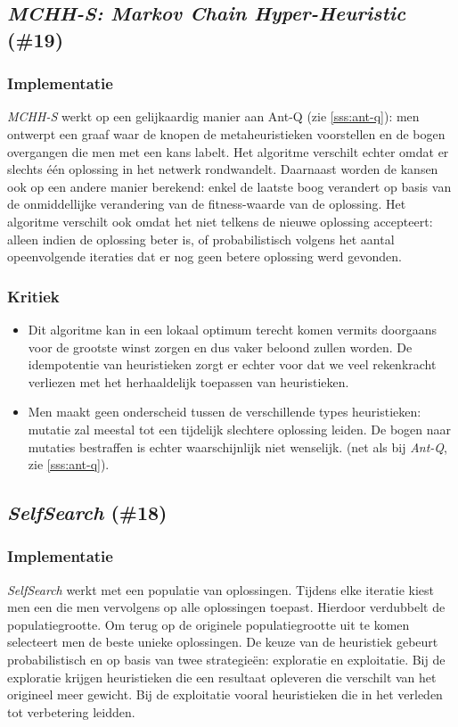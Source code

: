 \subsection{\emph{MCHH-S: Markov Chain Hyper-Heuristic} (\#19)}
\label{sss:mchh-s}
\subsubsection{Implementatie}
\emph{MCHH-S}\cite{chesc-mchh-s,conf/gecco/McClymontK11} werkt op een gelijkaardig manier aan Ant-Q (zie \ref{sss:ant-q}): men ontwerpt een graaf waar de knopen de metaheuristieken voorstellen en de bogen overgangen die men met een kans labelt. Het algoritme verschilt echter omdat er slechts \'e\'en oplossing in het netwerk rondwandelt. Daarnaast worden de kansen ook op een andere manier berekend: enkel de laatste boog verandert op basis van de onmiddellijke verandering van de fitness-waarde van de oplossing. Het algoritme verschilt ook omdat het niet telkens de nieuwe oplossing accepteert: alleen indien de oplossing beter is, of probabilistisch volgens het aantal opeenvolgende iteraties dat er nog geen betere oplossing werd gevonden.
\subsubsection{Kritiek}
\begin{itemize}
 \item Dit algoritme kan in een lokaal optimum terecht komen vermits \abls{} doorgaans voor de grootste winst zorgen en dus vaker beloond zullen worden. De idempotentie van \abls{} heuristieken zorgt er echter voor dat we veel rekenkracht verliezen met het herhaaldelijk toepassen van \abls{} heuristieken.
 \item Men maakt geen onderscheid tussen de verschillende types heuristieken: mutatie zal meestal tot een tijdelijk slechtere oplossing leiden. De bogen naar mutaties bestraffen is echter waarschijnlijk niet wenselijk. (net als bij \emph{Ant-Q}, zie \ref{sss:ant-q}).
\end{itemize}
\subsection{\emph{SelfSearch} (\#18)}
\label{sss:selfsearch}
\subsubsection{Implementatie}
\emph{SelfSearch}\cite{chesc-selfsearch} werkt met een populatie van oplossingen. Tijdens elke iteratie kiest men een \abllh{} die men vervolgens op alle oplossingen toepast. Hierdoor verdubbelt de populatiegrootte. Om terug op de originele populatiegrootte uit te komen selecteert men de beste unieke oplossingen. De keuze van de heuristiek gebeurt probabilistisch en op basis van twee strategie\"en: exploratie en exploitatie. Bij de exploratie krijgen heuristieken die een resultaat opleveren die verschilt van het origineel meer gewicht. Bij de exploitatie vooral heuristieken die in het verleden tot verbetering leidden.
